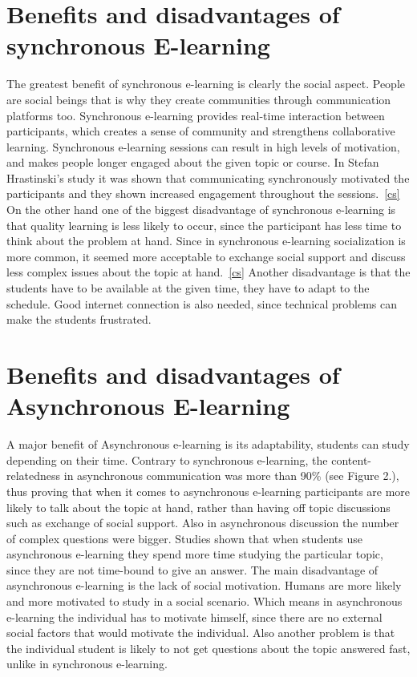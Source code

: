\documentclass[10pt,twoside,english,a4paper]{article}
\begin{document}
\section{Benefits and disadvantages of synchronous E-learning} \label{badose}
The greatest benefit of synchronous e-learning is clearly the social aspect.
People are social beings that is why they create communities through communication platforms too. Synchronous e-learning provides real-time interaction between participants, which creates a sense of community and strengthens collaborative learning. Synchronous e-learning sessions can result in high levels of motivation, and makes people longer engaged about the given topic or course. In Stefan Hrastinski's study it was shown that
communicating synchronously motivated the participants and they shown increased engagement throughout the sessions.~\ref{cs}
On the other hand one of the biggest disadvantage of synchronous e-learning is that quality learning is less likely to occur, since the participant has less time to think about the problem at hand. Since in synchronous e-learning socialization is more common, it seemed more acceptable to exchange social support and discuss less complex issues about the topic at hand.~\ref{cs} Another disadvantage is that the students have to be available at the given time, they have to adapt to the schedule. Good internet connection is also needed, since technical problems can make the students frustrated. 


\section{Benefits and disadvantages of Asynchronous E-learning} \label{badoae}
A major benefit of Asynchronous e-learning is its adaptability, students can study depending on their time. Contrary to synchronous e-learning, the content-relatedness in asynchronous communication was more than 90\% (see Figure 2.), thus proving that when it comes to asynchronous e-learning participants are more likely to talk about the topic at hand, rather than having off topic discussions such as exchange of social support.
Also in asynchronous discussion the number of complex questions were bigger.
Studies shown that when students use asynchronous e-learning they spend more time studying the particular topic, since they are not time-bound to give an answer. 
The main disadvantage of asynchronous e-learning is the lack of social motivation. Humans are more likely and more motivated to study in a social scenario. Which means in asynchronous e-learning the individual has to motivate himself, since there are no external social factors that would motivate the individual. Also another problem is that the individual student is likely to not get questions about the topic answered fast, unlike in synchronous e-learning.
\end{document}
